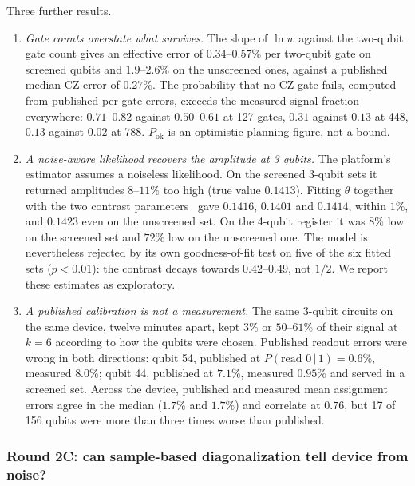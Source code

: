 \documentclass[11pt,a4paper]{article}
\begin{document}
Three further results.
\begin{enumerate}
  \item \emph{Gate counts overstate what survives.} The slope of $\ln w$
        against the two-qubit gate count gives an effective error of
        $0.34$--$0.57\%$ per two-qubit gate on screened qubits and
        $1.9$--$2.6\%$ on the unscreened ones, against a published median CZ
        error of $0.27\%$. The probability that no CZ gate fails, computed
        from published per-gate errors, exceeds the measured signal fraction
        everywhere: $0.71$--$0.82$ against $0.50$--$0.61$ at 127 gates,
        $0.31$ against $0.13$ at 448, $0.13$ against $0.02$ at 788.
        $P_{\mathrm{ok}}$ is an optimistic planning figure, not a bound.
  \item \emph{A noise-aware likelihood recovers the amplitude at 3 qubits.}
        The platform's estimator assumes a noiseless likelihood. On the
        screened 3-qubit sets it returned amplitudes $8$--$11\%$ too high
        (true value $0.1413$). Fitting $\theta$ together with the two
        contrast parameters~\cite{tanaka2021} gave $0.1416$, $0.1401$ and
        $0.1414$, within $1\%$, and $0.1423$ even on the unscreened set. On
        the 4-qubit register it was $8\%$ low on the screened set and
        $72\%$ low on the unscreened one. The model is nevertheless
        rejected by its own goodness-of-fit test on five of the six fitted
        sets ($p < 0.01$): the contrast decays towards $0.42$--$0.49$, not
        $1/2$. We report these estimates as exploratory.
  \item \emph{A published calibration is not a measurement.} The same
        3-qubit circuits on the same device, twelve minutes apart, kept
        $3\%$ or $50$--$61\%$ of their signal at $k=6$ according to how the
        qubits were chosen. Published readout errors were wrong in both
        directions: qubit 54, published at $P(\text{read }0\,|\,1) = 0.6\%$,
        measured $8.0\%$; qubit 44, published at $7.1\%$, measured $0.95\%$
        and served in a screened set. Across the
        device, published and measured mean assignment errors agree in the
        median ($1.7\%$ and $1.7\%$) and correlate at $0.76$, but 17 of 156
        qubits were more than three times worse than published.
\end{enumerate}

\subsubsection{Round 2C: can sample-based diagonalization tell device from noise?}
\end{document}
